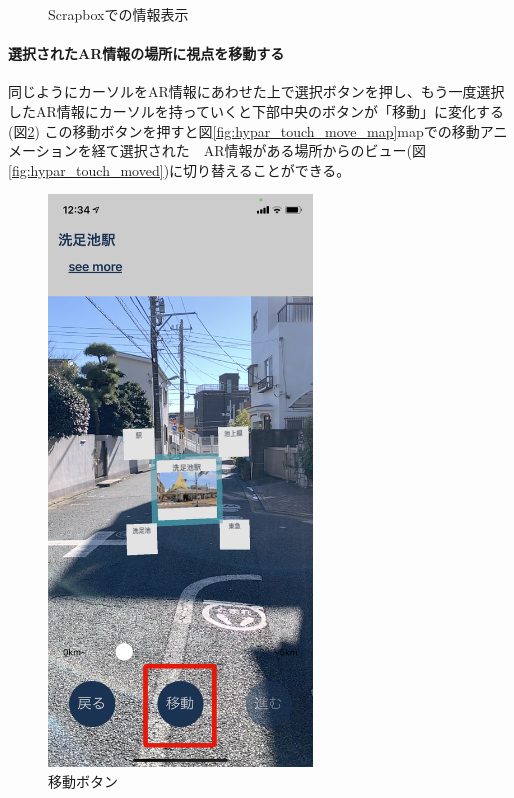 \begin{figure}[htbp]
\begin{minipage}{0.5\hsize}
    \caption{Scrapboxでの情報表示} \label{fig:hypar_touch_webview}
  \end{minipage}
\end{figure}

\paragraph*{選択されたAR情報の場所に視点を移動する}
同じようにカーソルをAR情報にあわせた上で選択ボタンを押し、もう一度選択したAR情報にカーソルを持っていくと下部中央のボタンが「移動」に変化する(図\ref{fig:hypar_touch_move_button})
この移動ボタンを押すと図\ref{fig:hypar_touch_move_map}mapでの移動アニメーションを経て選択された　AR情報がある場所からのビュー(図\ref{fig:hypar_touch_moved})に切り替えることができる。

\begin{figure}[htbp]
  \begin{minipage}{0.5\hsize}
    \centering
    \includegraphics[width=70mm]{images/hypar_touch_move_button.png}
    \caption{移動ボタン} \label{fig:hypar_touch_move_button}
  \end{minipage}
  \begin{minipage}{0.5\hsize}

\end{minipage}
\end{figure}
